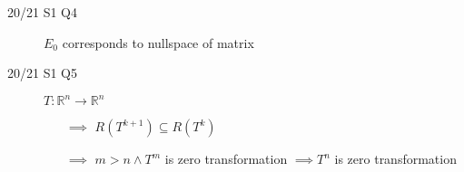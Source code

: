 \documentclass[landscape, a4paper]{article}
\newcommand{\R}{\mathbb{R}}
\renewcommand{\and}{\wedge}
\begin{document}
\begin{multicols*}{4}
\begin{description}
        \item[20/21 S1 Q4] $E_0$ corresponds to nullspace of matrix
            \item[20/21 S1 Q5]$T:\R^n\rightarrow\R^n$
            \begin{enumerate}
                \item[$\implies$] $R(T^{k+1})\subseteq R(T^k)$
                \item[$\implies$] $m>n\and T^m$ is zero transformation $\implies T^n$ is zero transformation
            \end{enumerate}
    \end{description}
\end{multicols*}
\end{document}
